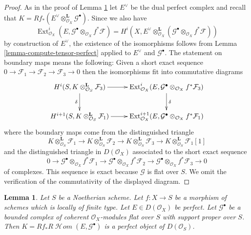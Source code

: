 \documentclass{amsart}
\theoremstyle{plain}
\newtheorem{lemma}[subsection]{Lemma}
\theoremstyle{definition}
\theoremstyle{remark}
\numberwithin{equation}{subsection}
\def\Ext{\mathop{\mathrm{Ext}}\nolimits}
\def\SheafHom{\mathop{\mathcal{H}\!\mathit{om}}\nolimits}
\begin{document}
\begin{proof}
As in the proof of Lemma \ref{lemma-ext-perfect} let $E^\vee$ be the
dual perfect complex and recall that
$K = Rf_*(E^\vee \otimes_{\mathcal{O}_X}^\mathbf{L} \mathcal{G}^\bullet)$.
Since we also have
$$
\Ext^i_{\mathcal{O}_X}(E,
\mathcal{G}^\bullet \otimes_{\mathcal{O}_X} f^*\mathcal{F})
=
H^i(X, E^\vee \otimes^\mathbf{L}_{\mathcal{O}_X}
(\mathcal{G}^\bullet \otimes_{\mathcal{O}_X} f^*\mathcal{F}))
$$
by construction of $E^\vee$, the existence of the isomorphisms follows
from Lemma \ref{lemma-compute-tensor-perfect} applied to $E^\vee$
and $\mathcal{G}^\bullet$.
The statement on boundary maps means the following: Given a short
exact sequence $0 \to \mathcal{F}_1 \to \mathcal{F}_2 \to \mathcal{F}_3 \to 0$
then the isomorphisms fit into commutative diagrams
$$
\xymatrix{
H^i(S, K \otimes^\mathbf{L}_{\mathcal{O}_S} \mathcal{F}_3)
\ar[r] \ar[d]_\delta &
\Ext^i_{\mathcal{O}_X}(E,
\mathcal{G}^\bullet \otimes_{\mathcal{O}_X} f^*\mathcal{F}_3) \ar[d]^\delta \\
H^{i + 1}(S, K \otimes^\mathbf{L}_{\mathcal{O}_S} \mathcal{F}_1)
\ar[r] &
\Ext^{i + 1}_{\mathcal{O}_X}(E,
\mathcal{G}^\bullet \otimes_{\mathcal{O}_X} f^*\mathcal{F}_1)
}
$$
where the boundary maps come from the distinguished triangle
$$
K \otimes^\mathbf{L}_{\mathcal{O}_S} \mathcal{F}_1 \to
K \otimes^\mathbf{L}_{\mathcal{O}_S} \mathcal{F}_2 \to
K \otimes^\mathbf{L}_{\mathcal{O}_S} \mathcal{F}_3 \to
K \otimes^\mathbf{L}_{\mathcal{O}_S} \mathcal{F}_1[1]
$$
and the distinguished triangle in $D(\mathcal{O}_X)$ associated to
the short exact sequence
$$
0 \to
\mathcal{G}^\bullet \otimes_{\mathcal{O}_X} f^*\mathcal{F}_1 \to
\mathcal{G}^\bullet \otimes_{\mathcal{O}_X} f^*\mathcal{F}_2 \to
\mathcal{G}^\bullet \otimes_{\mathcal{O}_X} f^*\mathcal{F}_3 \to 0
$$
of complexes.
This sequence is exact because $\mathcal{G}$ is flat over $S$.
We omit the verification of the commutativity of the displayed diagram.
\end{proof}


\begin{lemma}
\label{lemma-ext-perfect}
Let $S$ be a Noetherian scheme. Let $f : X \to S$ be a morphism of schemes
which is locally of finite type. Let $E \in D(\mathcal{O}_X)$ be perfect.
Let $\mathcal{G}^\bullet$ be a bounded complex of coherent
$\mathcal{O}_X$-modules flat over $S$ with support proper over $S$.
Then $K = Rf_*R\SheafHom(E, \mathcal{G}^\bullet)$ is a perfect object of
$D(\mathcal{O}_S)$.
\end{lemma}
\end{document}
